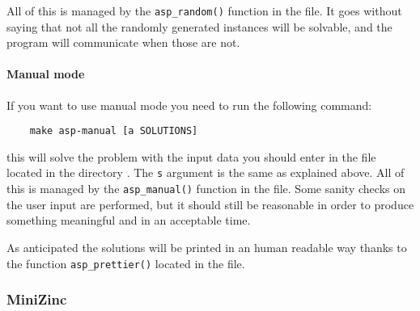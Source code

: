 All of this is managed by the \texttt{asp_random()} function in the  file. 
It goes without saying that not all the randomly generated instances will be solvable, and the program will communicate when those are not.

\paragraph{Manual mode}

If you want to use manual mode you need to run the following command:
\begin{verbatim}
    make asp-manual [a SOLUTIONS]
\end{verbatim}
this will solve the problem with the input data you should enter in the file  located in the directory . The \texttt{s} argument is the same as explained above. All of this is managed by the \texttt{asp_manual()} function in the  file.
Some sanity checks on the user input are performed, but it should still be reasonable in order to produce something meaningful and in an acceptable time.

As anticipated the solutions will be printed in an human readable way thanks to the function \texttt{asp_prettier()} located in the  file.

\subsubsection{MiniZinc}
